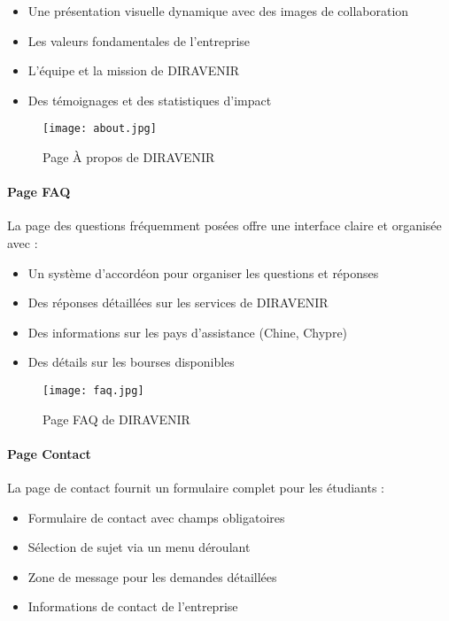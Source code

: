 \documentclass[12pt,a4paper]{report}
\begin{document}
\begin{itemize}
    \item Une présentation visuelle dynamique avec des images de collaboration
    \item Les valeurs fondamentales de l'entreprise
    \item L'équipe et la mission de DIRAVENIR
    \item Des témoignages et des statistiques d'impact
\end{itemize}

\begin{figure}[H]
\centering
\texttt{[image: about.jpg]}
\caption{Page À propos de DIRAVENIR}
\label{fig:about-page}
\end{figure}

\paragraph{Page FAQ}

La page des questions fréquemment posées offre une interface claire et organisée avec :

\begin{itemize}
    \item Un système d'accordéon pour organiser les questions et réponses
    \item Des réponses détaillées sur les services de DIRAVENIR
    \item Des informations sur les pays d'assistance (Chine, Chypre)
    \item Des détails sur les bourses disponibles
\end{itemize}

\begin{figure}[H]
\centering
\texttt{[image: faq.jpg]}
\caption{Page FAQ de DIRAVENIR}
\label{fig:faq-page}
\end{figure}

\paragraph{Page Contact}

La page de contact fournit un formulaire complet pour les étudiants :

\begin{itemize}
    \item Formulaire de contact avec champs obligatoires
    \item Sélection de sujet via un menu déroulant
    \item Zone de message pour les demandes détaillées
    \item Informations de contact de l'entreprise
\end{itemize}
\end{document}
